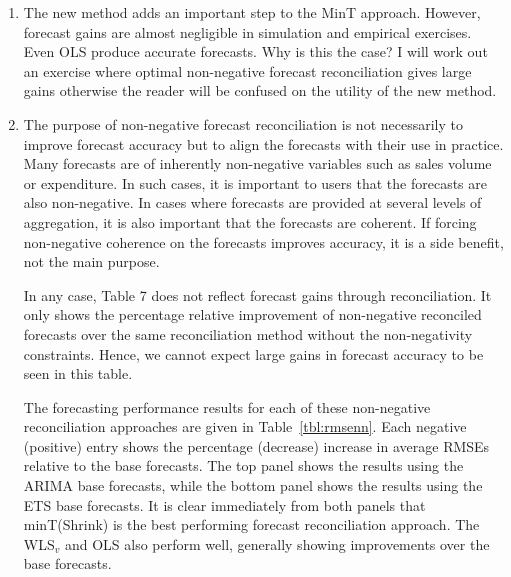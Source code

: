 \documentclass[10pt,a4paper]{article}
\begin{document}
\begin{enumerate}
{	%
	}

	\item The new method adds an important step to the MinT approach. However, forecast gains are almost negligible in simulation and empirical exercises. Even OLS produce accurate forecasts. Why is this the case? I will work out an exercise where optimal non-negative forecast reconciliation gives large gains otherwise the reader will be confused on the utility of the new method.
	\item [] {\color{blue} The purpose of non-negative forecast reconciliation is not necessarily to improve forecast accuracy but to align the forecasts with their use in practice. Many forecasts are of inherently non-negative variables such as sales volume or expenditure. In such cases, it is important to users that the forecasts are also non-negative. In cases where forecasts are provided at several levels of aggregation, it is also important that the forecasts are coherent. If forcing non-negative coherence on the forecasts improves accuracy, it is a side benefit, not the main purpose.

  In any case, Table 7 does not reflect forecast gains through reconciliation. It only shows the percentage relative improvement of non-negative reconciled forecasts over the same reconciliation method without the non-negativity constraints. Hence, we cannot expect large gains in forecast accuracy to be seen in this table.

	The forecasting performance results for each of these non-negative reconciliation approaches are given in Table~\ref{tbl:rmsenn}. Each negative (positive) entry shows the percentage (decrease) increase in average RMSEs relative to the base forecasts. The top panel shows the results using the ARIMA base forecasts, while the bottom panel shows the results using the ETS base forecasts. It is clear immediately from both panels that minT(Shrink) is the best performing forecast reconciliation approach. The WLS$_v$ and OLS also perform well, generally showing improvements over the base forecasts.

}
\end{enumerate}
\end{document}
